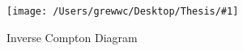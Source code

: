 \documentclass{report}
\newcommand{\singleFig}[3]{
 \begin{figure}[!ht]
  \centering
  \texttt{[image: /Users/grewwc/Desktop/Thesis/\#1]}
  \caption{#3}
 \label{fig: #1}
 \end{figure}
}
\begin{document}
\listoffigures

\singleFig{inverse_compton}{0.45}{Inverse Compton Diagram}
\end{document}
